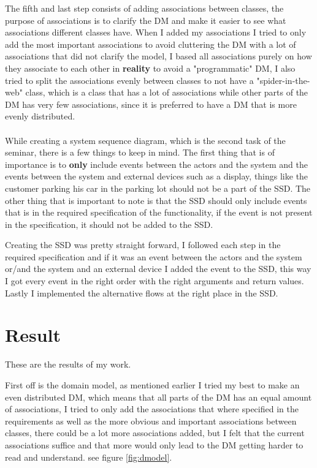 \documentclass[a4paper]{scrreprt}
\begin{document}
The fifth and last step consists of adding associations between classes, the purpose of associations is to clarify the DM and make it easier to see what associations different classes have. When I added my associations I tried to only add the most important associations to avoid cluttering the DM with a lot of associations that did not clarify the model, I based all associations purely on how they associate to each other in \textbf{{reality}} to avoid a "programmatic" DM, I also tried to split the associations evenly between classes to not have a "spider-in-the-web" class, which is a class that has a lot of associations while other parts of the DM has very few associations, since it is preferred to have a DM that is more evenly distributed.\\
\\
While creating a system sequence diagram, which is the second task of the seminar, there is a few things to keep in mind. The first thing that is of importance is to \textbf{only} include events between the actors and the system and the events between the system and external devices such as a display, things like the customer parking his car in the parking lot should not be a part of the SSD. The other thing that is important to note is that the SSD should only include events that is in the required specification of the functionality, if the event is not present in the specification, it should not be added to the SSD.

Creating the SSD was pretty straight forward, I followed each step in the required specification and if it was an event between the actors and the system or/and the system and an external device I added the event to the SSD, this way I got every event in the right order with the right arguments and return values. Lastly I implemented the alternative flows at the right place in the SSD.



\chapter{Result}
\label{sec:result}

These are the results of my work.

First off is the domain model, as mentioned earlier I tried my best to make an even distributed DM, which means that all parts of the DM has an equal amount of associations, I tried to only add the associations that where specified in the requirements as well as the more obvious and important associations between classes, there could be a lot more associations added, but I felt that the current associations suffice and that more would only lead to the DM getting harder to read and understand. see figure \ref{fig:dmodel}.
\end{document}
